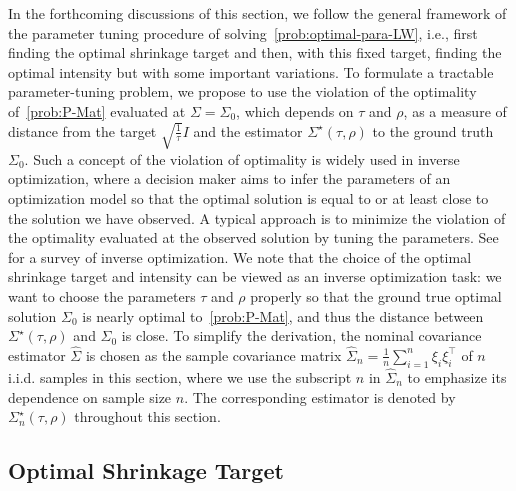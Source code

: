 \documentclass[11pt]{article}
\newcommand{\opt}{^\star}
\def\transpose{\top}
\newcommand{\wh}{\widehat}
\begin{document}
In the forthcoming discussions of this section, we follow the general framework of the parameter tuning procedure of solving~\eqref{prob:optimal-para-LW}, i.e., first finding the optimal shrinkage target and then, with this fixed target, finding the optimal intensity but with some important variations. To formulate a tractable parameter-tuning problem, we propose to use the violation of the optimality of~\eqref{prob:P-Mat} evaluated at $\Sigma=\Sigma_0$, which depends on $\tau$ and $\rho$, as a measure of distance from the target $\sqrt{\frac{1}{\tau}}I$ and the estimator $\Sigma\opt(\tau, \rho)$ to the ground truth $\Sigma_0$. 
Such a concept of the violation of optimality is widely used in inverse optimization, where a decision maker aims to infer the parameters of an optimization model so that the optimal solution is equal to or at least close to the solution we have observed. A typical approach is to minimize the violation of the optimality evaluated at the observed solution by tuning the parameters. See~\cite{ref:chan2025inverse} for a survey of inverse optimization. We note that the choice of the optimal shrinkage target and intensity can be viewed as an inverse optimization task: we want to choose the parameters $\tau$ and $ \rho$ properly so that the ground true optimal solution $\Sigma_0$ is nearly optimal to~\eqref{prob:P-Mat}, and thus the distance between $\Sigma\opt(\tau,\rho)$ and $\Sigma_0$ is close. To simplify the derivation, the nominal covariance estimator $\wh\Sigma$ is chosen as the sample covariance matrix $\wh\Sigma_n=\frac{1}{n}\sum_{i=1}^n \xi_i\xi_i^\transpose$ of $n$ i.i.d. samples in this section, where we use the subscript $n$ in $\wh\Sigma_n$ to emphasize its dependence on sample size $n$. The corresponding estimator is denoted by $\Sigma_n\opt(\tau, \rho)$ throughout this section. 



\subsection{Optimal Shrinkage Target}\label{sec:opt-target}
\end{document}

